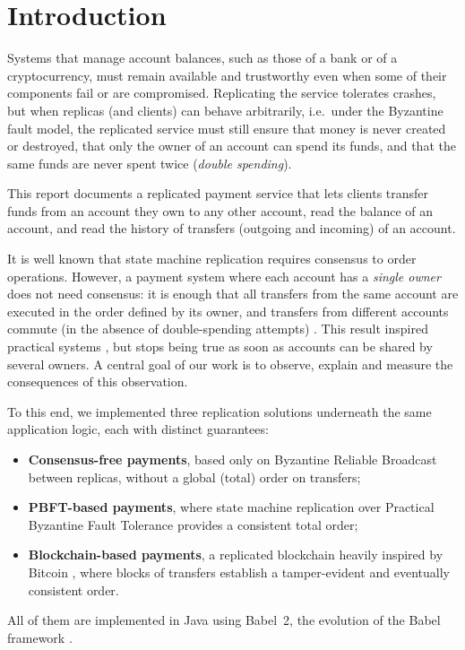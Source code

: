 \documentclass[sigconf,a4paper]{acmart}
\begin{document}
    \section{Introduction}
    \label{sec:intro}

    Systems that manage account balances, such as those of a bank or of a
    cryptocurrency, must remain available and trustworthy even when some of their
    components fail or are compromised. Replicating the service tolerates crashes,
    but when replicas (and clients) can behave arbitrarily, i.e.\ under the
    Byzantine fault model, the replicated service must still ensure that money is
    never created or destroyed, that only the owner of an account can spend its
    funds, and that the same funds are never spent twice (\emph{double spending}).

    This report documents a replicated payment service that lets clients
    transfer funds from an account they own to any other account, read the
    balance of an account, and read the history of transfers (outgoing and
    incoming) of an account.

    It is well known that state machine replication requires consensus to order
    operations. However, a payment system where each account has a \emph{single
    owner} does not need consensus: it is enough that all transfers from the same
    account are executed in the order defined by its owner, and transfers from
    different accounts commute (in the absence of double-spending attempts)
    \cite{the-consensus-number-of-a-cryptocurrency}. This result inspired
    practical systems \cite{online-payments-by-merely-broadcasting-messages}, but
    stops being true as soon as accounts can be shared by several owners. A
    central goal of our work is to observe, explain and measure the consequences
    of this observation.

    To this end, we implemented three replication solutions underneath the same
    application logic, each with distinct guarantees:
    \begin{itemize}
        \item \textbf{Consensus-free payments}, based only on Byzantine Reliable
        Broadcast \cite{asynchronous-byzantine-agreement-protocols,introduction-to-reliable-and-secure-distributed-programming}
        between replicas, without a global (total) order on transfers;
        \item \textbf{PBFT-based payments}, where state machine replication over
        Practical Byzantine Fault Tolerance \cite{practical-byzantine-fault-tolerance}
        provides a consistent total order;
        \item \textbf{Blockchain-based payments}, a replicated blockchain heavily
        inspired by Bitcoin \cite{bitcoin}, where blocks of transfers establish a
        tamper-evident and eventually consistent order.
    \end{itemize}
    All of them are implemented in Java using Babel~2, the evolution of the Babel
    framework \cite{babel_framework}.
\end{document}
